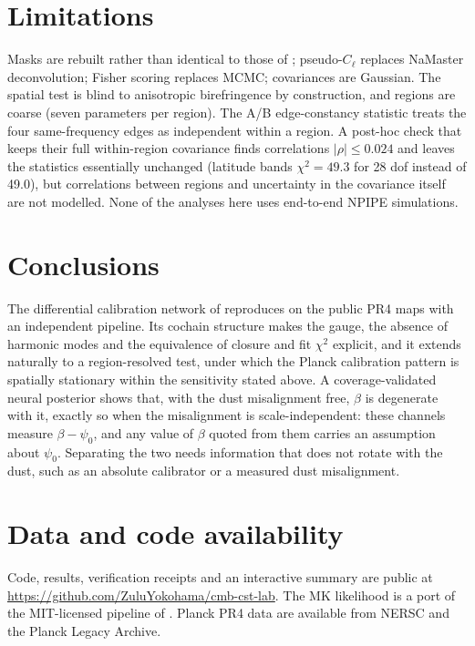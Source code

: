 \documentclass[twocolumn]{aastex631}
\begin{document}
\section{Limitations}
Masks are rebuilt rather than identical to those of \citet{lka2026}; pseudo-$C_\ell$ replaces
NaMaster deconvolution; Fisher scoring replaces MCMC; covariances are Gaussian. The spatial test is
blind to anisotropic birefringence by construction, and regions are coarse (seven parameters per
region). The A/B edge-constancy statistic treats the four same-frequency edges as independent
within a region. A post-hoc check that keeps their full within-region covariance finds
correlations $|\rho|\le0.024$ and leaves the statistics essentially unchanged (latitude bands
$\chi^2=49.3$ for 28 dof instead of 49.0), but correlations between regions and uncertainty in the
covariance itself are not modelled. None of the analyses here uses end-to-end NPIPE simulations.

\section{Conclusions}
The differential calibration network of \citet{lka2026} reproduces on the public PR4 maps with an
independent pipeline. Its cochain structure makes the gauge, the absence of harmonic modes and the
equivalence of closure and fit $\chi^2$ explicit, and it extends naturally to a region-resolved
test, under which the Planck calibration pattern is spatially stationary within the sensitivity
stated above. A coverage-validated neural posterior shows that, with the dust misalignment free,
$\beta$ is degenerate with it, exactly so when the misalignment is scale-independent: these
channels measure $\beta-\psi_0$, and any value of
$\beta$ quoted from them carries an assumption about $\psi_0$. Separating the two needs
information that does not rotate with the dust, such as an absolute calibrator or a measured
dust misalignment.

\section*{Data and code availability}
Code, results, verification receipts and an interactive summary are public at
\url{https://github.com/ZuluYokohama/cmb-cst-lab}. The MK likelihood is a port of the MIT-licensed
pipeline of \citet{lka2026}. Planck PR4 data are available from NERSC and the Planck Legacy Archive.
\end{document}
